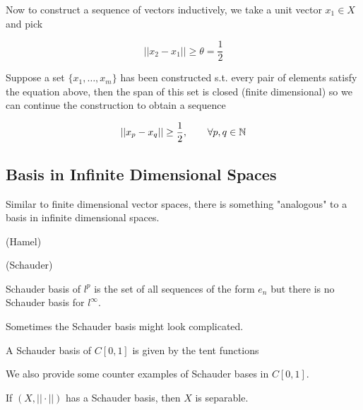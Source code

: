 \documentclass{article}
\begin{document}
Now to construct a sequence of vectors inductively, we take a unit vector $x_1 \in X$ and pick  

\begin{equation*}
    ||x_2-x_1|| \geq \theta=\frac{1}{2}
\end{equation*}  

Suppose a set $\{x_1, \ldots, x_m\}$ has been constructed s.t. every pair of elements satisfy the equation above, then the span of this set is closed (finite dimensional) so we can continue the construction to obtain a sequence  

\begin{equation*}
    ||x_p-x_q|| \geq \frac{1}{2}, \qquad \forall p, q \in \mathbb{N}
\end{equation*}

\subsection{Basis in Infinite Dimensional Spaces}  

Similar to finite dimensional vector spaces, there is something "analogous" to 
a basis in infinite dimensional spaces.  

\begin{defn}
    (Hamel)
\end{defn}  

\begin{defn}
    (Schauder)
\end{defn}   

\begin{eg}
    Schauder basis of $l^p$ is the set of all sequences of the form $e_n$ but there is no 
    Schauder basis for $l^{\infty}$.  
\end{eg}  

Sometimes the Schauder basis might look complicated.    
\begin{eg}
    A Schauder basis of $C[0,1]$ is given by the tent functions
\end{eg}  

We also provide some counter examples of Schauder bases in $C[0,1]$.  

\begin{eg}

\end{eg}

\begin{thm}
    If $(X, ||\cdot||)$ has a Schauder basis, then $X$ is separable.  
\end{thm}  
\end{document}
